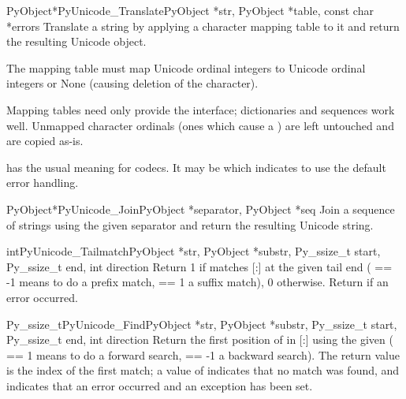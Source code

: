 \begin{cfuncdesc}{PyObject*}{PyUnicode_Translate}{PyObject *str,
                                                  PyObject *table,
                                                  const char *errors}
  Translate a string by applying a character mapping table to it and
  return the resulting Unicode object.

  The mapping table must map Unicode ordinal integers to Unicode
  ordinal integers or None (causing deletion of the character).

  Mapping tables need only provide the 
  interface; dictionaries and sequences work well.  Unmapped character
  ordinals (ones which cause a ) are left
  untouched and are copied as-is.

   has the usual meaning for codecs. It may be \NULL{}
  which indicates to use the default error handling.
\end{cfuncdesc}

\begin{cfuncdesc}{PyObject*}{PyUnicode_Join}{PyObject *separator,
                                             PyObject *seq}
  Join a sequence of strings using the given separator and return the
  resulting Unicode string.
\end{cfuncdesc}

\begin{cfuncdesc}{int}{PyUnicode_Tailmatch}{PyObject *str,
                                                  PyObject *substr,
                                                  Py_ssize_t start,
                                                  Py_ssize_t end,
                                                  int direction}
  Return 1 if  matches [:] at
  the given tail end ( == -1 means to do a prefix
  match,  == 1 a suffix match), 0 otherwise.
  Return  if an error occurred.
\end{cfuncdesc}

\begin{cfuncdesc}{Py_ssize_t}{PyUnicode_Find}{PyObject *str,
                                       PyObject *substr,
                                       Py_ssize_t start,
                                       Py_ssize_t end,
                                       int direction}
  Return the first position of  in
  [:] using the given 
  ( == 1 means to do a forward search,
   == -1 a backward search).  The return value is the
  index of the first match; a value of  indicates that no
  match was found, and  indicates that an error occurred and
  an exception has been set.
\end{cfuncdesc}

